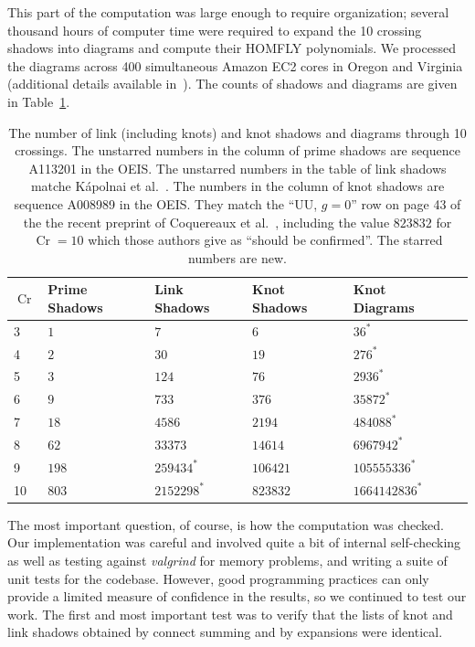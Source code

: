 \documentclass[amsmath,secnumarabic,amssymb,floatfix,nofootinbib,nobibnotes,letterpaper,11pt,tightenlines,showkeys]{revtex4}
\theoremstyle{definition}
\newcommand{\valgrind}{\textit{valgrind} }
\newcommand{\Cr}{\operatorname{Cr}}
\let\mgp=\marginpar \marginparwidth18mm \marginparsep1mm
\def\marginpar#1{\mgp{\raggedright\tiny #1}}
\let\lbl=\label
\def\label#1{\lbl{#1}\ifinner\else\marginpar{\ref{#1} #1}\ignorespaces\fi}
\begin{document}
This part of the computation was large enough to require organization; several thousand hours of computer time were required to expand the 10 crossing shadows into diagrams and compute their HOMFLY polynomials. We processed the diagrams across 400 simultaneous Amazon EC2 cores in Oregon and Virginia (additional details available in~\cite{Cantarella:2016arxiv}). The counts of shadows and diagrams are given in Table~\ref{tab:counts}.

\begin{table}[H]
\begin{ruledtabular}
\begin{tabular}{llllll}
$\Cr$ & Prime Shadows & Link Shadows    & Knot Shadows     & Knot Diagrams \\ \hline
3  & $\num{1}$   & $\num{7}$         & $\num{6}$        & $\num{36}^*$ \\
4  & $\num{2}$   & $\num{30}$        & $\num{19}$       & $\num{276}^*$ \\
5  & $\num{3}$   & $\num{124}$       & $\num{76}$       & $\num{2936}^*$ \\
6  & $\num{9}$   & $\num{733}$       & $\num{376}$      & $\num{35872}^*$ \\
7  & $\num{18}$  & $\num{4586}$      & $\num{2194}$     & $\num{484088}^*$ \\
8  & $\num{62}$  & $\num{33373}$     & $\num{14614}$    & $\num{6967942}^*$ \\
9  & $\num{198}$ & $\num{259434}^*$  & $\num{106421}$   & $\num{105555336}^*$ \\
10 & $\num{803}$ & $\num{2152298}^*$ & $\num{823832}$   & $\num{1664142836}^*$ \\
\end{tabular}
\end{ruledtabular}
\caption{The number of link (including knots) and knot shadows and diagrams through 10 crossings. The unstarred numbers in the column of prime shadows are sequence A113201 in the OEIS. The unstarred numbers in the table of link shadows matche K\'apolnai et al.~\cite{Kapolnai:2012hs}. The numbers in the column of knot shadows are sequence A008989 in the OEIS. They match the ``UU, $g=0$'' row on page 43 of the the recent preprint of Coquereaux et al.~\cite{Coquereaux:2015wv}, including the value $\num{823832}$ for $\Cr=10$ which those authors give as ``should be confirmed''. The starred numbers are new.}
\label{tab:counts}
\end{table}

The most important question, of course, is how the computation was checked. Our implementation was careful and involved quite a bit of internal self-checking as well as testing against \valgrind for memory problems, and writing a suite of unit tests for the codebase. However, good programming practices can only provide a limited measure of confidence in the results, so we continued to test our work. The first and most important test was to verify that the lists of knot and link shadows obtained by connect summing and by expansions were identical.
\end{document}
